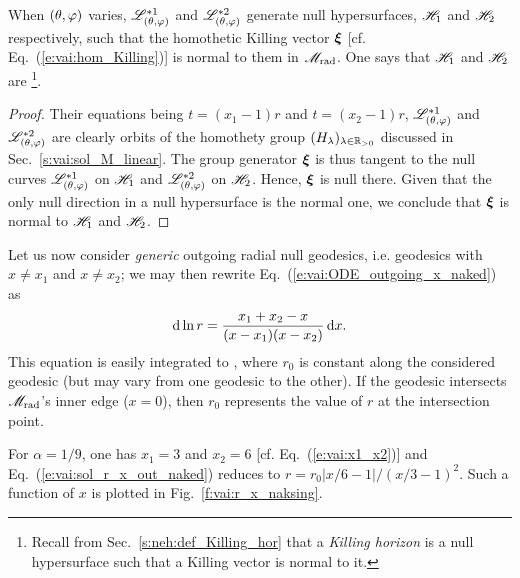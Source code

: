 \begin{prop}
When $(\theta,\varphi)$ varies, $\mathscr{L}^{*1}_{(\theta,\varphi)}$ and $\mathscr{L}^{*2}_{(\theta,\varphi)}$
generate null hypersurfaces, $\mathscr{H}_1$ and $\mathscr{H}_2$ respectively,
such that the homothetic Killing vector $\bm{\xi}$
[cf. Eq.~(\ref{e:vai:hom_Killing})] is normal to them
in $\mathscr{M}_{\rm rad}$. One says that $\mathscr{H}_1$ and $\mathscr{H}_2$
are
\footnote{Recall from Sec.~\ref{s:neh:def_Killing_hor} that
a \emph{Killing horizon} is a null hypersurface such that a Killing vector is normal to it.}.
\end{prop}
\begin{proof}
Their equations being $t=(x_1 - 1)r$ and $t=(x_2 - 1)r$, $ \mathscr{L}^{*1}_{(\theta,\varphi)}$ and
$ \mathscr{L}^{*2}_{(\theta,\varphi)}$ are clearly orbits of the
homothety group $(H_\lambda)_{\lambda\in \mathbb{R}_{>0}}$ discussed in Sec.~\ref{s:vai:sol_M_linear}.
The group generator $\bm{\xi}$ is thus tangent to the null curves $\mathscr{L}^{*1}_{(\theta,\varphi)}$ on $\mathscr{H}_1$
and $\mathscr{L}^{*2}_{(\theta,\varphi)}$ on $\mathscr{H}_2$. Hence,
$\bm{\xi}$ is null there. Given that the
only null direction in a null hypersurface is the normal one, we conclude
that  $\bm{\xi}$ is normal to $\mathscr{H}_1$ and $\mathscr{H}_2$.
\end{proof}


Let us now consider \emph{generic} outgoing radial null geodesics, i.e.
geodesics with
$x\neq x_1$ and $x \neq x_2$; we may then rewrite Eq.~(\ref{e:vai:ODE_outgoing_x_naked}) as
\[
    \mathrm{d} \ln r = \frac{x_1 + x_2 - x}{(x - x_1)(x - x_2)} \, \mathrm{d} x .
\]
This equation is easily integrated to
\be \label{e:vai:sol_r_x_out_naked}
   ,
\ee
where $r_0$ is constant along the considered geodesic (but may vary from one geodesic to the other).
If the geodesic intersects $\mathscr{M}_{\rm rad}$'s inner edge ($x=0$), then $r_0$ represents
the value of $r$ at the intersection point.

\begin{example} \label{x:vai:sol_out_1o9}
For $\alpha=1/9$, one has $x_1 = 3$ and $x_2 = 6$ [cf. Eq.~(\ref{e:vai:x1_x2})]
and Eq.~(\ref{e:vai:sol_r_x_out_naked}) reduces to
$r = r_0 |x/6 - 1|/(x/3 - 1)^2$. Such a function of $x$ is
plotted in Fig.~\ref{f:vai:r_x_naksing}.
\end{example}

